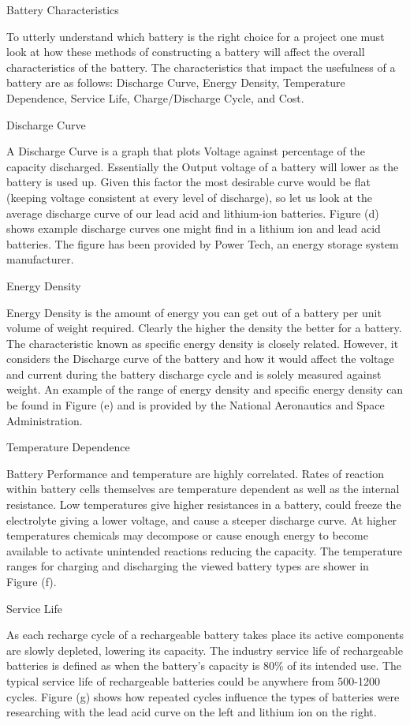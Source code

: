 Battery Characteristics 

To utterly understand which battery is the right choice for a project one must look at how these methods of constructing a battery will affect the overall characteristics of the battery. The characteristics that impact the usefulness of a battery are as follows: Discharge Curve, Energy Density, Temperature Dependence, Service Life, Charge/Discharge Cycle, and Cost.

Discharge Curve 

A Discharge Curve is a graph that plots Voltage against percentage of the capacity discharged. Essentially the Output voltage of a battery will lower as the battery is used up. Given this factor the most desirable curve would be flat (keeping voltage consistent at every level of discharge), so let us look at the average discharge curve of our lead acid and lithium-ion batteries. Figure (d) shows example discharge curves one might find in a lithium ion and lead acid batteries. The figure has been provided by Power Tech, an energy storage system manufacturer. 

Energy Density 

Energy Density is the amount of energy you can get out of a battery per unit volume of weight required. Clearly the higher the density the better for a battery. The characteristic known as specific energy density is closely related. However, it considers the Discharge curve of the battery and how it would affect the voltage and current during the battery discharge cycle and is solely measured against weight. An example of the range of energy density and specific energy density can be found in Figure (e) and is provided by the National Aeronautics and Space Administration.

Temperature Dependence 

Battery Performance and temperature are highly correlated. Rates of reaction within battery cells themselves are temperature dependent as well as the internal resistance. Low temperatures give higher resistances in a battery, could freeze the electrolyte giving a lower voltage, and cause a steeper discharge curve. At higher temperatures chemicals may decompose or cause enough energy to become available to activate unintended reactions reducing the capacity. The temperature ranges for charging and discharging the viewed battery types are shower in Figure (f). 

Service Life 

As each recharge cycle of a rechargeable battery takes place its active components are slowly depleted, lowering its capacity. The industry service life of rechargeable batteries is defined as when the battery's capacity is 80\% of its intended use. The typical service life of rechargeable batteries could be anywhere from 500-1200 cycles. Figure (g) shows how repeated cycles influence the types of batteries were researching with the lead acid curve on the left and lithium ion on the right. 

